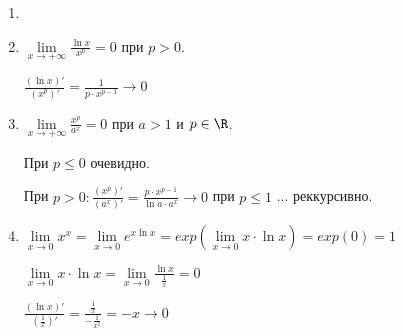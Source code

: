 \begin{example}
    \begin{enumerate}
        \item[]
        \item $\lim\limits_{x\rightarrow+\infty}\frac{\ln x}{x^p}=0$ при $p>0$.

        $\frac{(\ln x)'}{(x^p)'}=\frac{1}{p\cdot x^{p-1}}\rightarrow 0$
        \item $\lim\limits_{x\rightarrow+\infty}\frac{x^p}{a^x}=0$ при $a>1$ и $p\in \R$.

        При $p\leq 0$ очевидно.

        При $p>0:\frac{(x^p)'}{(a^x)'}=\frac{p\cdot x^{p-1}}{\ln a\cdot a^x}\rightarrow 0$ при $p\leq 1$ ... реккурсивно.
        \item $\lim\limits_{x\rightarrow 0}x^x=\lim\limits_{x\rightarrow 0} e^{x\ln x}=exp(\lim\limits_{x\rightarrow 0} x\cdot \ln x)=exp(0)=1$

        $\lim\limits_{x\rightarrow 0} x\cdot \ln x = \lim\limits_{x\rightarrow 0} \frac{\ln x}{\frac{1}{x}}=0$

        $ \frac{(\ln x)'}{(\frac{1}{x})'}=\frac{\frac{1}{x}}{-\frac{1}{x^2}}=-x\rightarrow 0$
    \end{enumerate}
\end{example}
